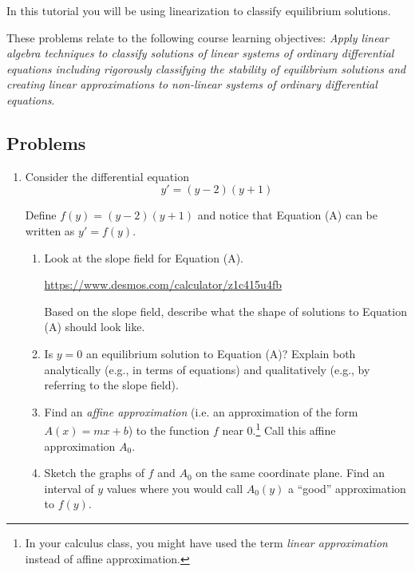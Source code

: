 \begin{objectives}
	In this tutorial you will be using linearization to classify equilibrium solutions.

	These problems relate to the following course learning objectives:
	\textit{Apply linear algebra techniques to classify solutions of linear systems of ordinary differential
	equations including rigorously classifying the stability of equilibrium solutions and creating
	linear approximations to non-linear systems of ordinary differential equations}.
\end{objectives}


\subsection*{Problems}

\begin{enumerate}
	\item 	Consider the differential equation
	      \begin{equation}
		      y'=(y-2)(y+1)\tag{A}
	      \end{equation}

	      Define $f(y)=(y-2)(y+1)$ and notice that Equation (A) can be written as $y'=f(y)$.

	      \begin{enumerate}
		      \item Look at the slope field for Equation (A).

		            \url{https://www.desmos.com/calculator/z1c415u4fb}

		            Based on the slope field, describe what the shape of solutions to Equation (A) should look like.

		      \item Is $y=0$ an equilibrium solution to Equation (A)? Explain both analytically (e.g., in terms of equations)
		            and qualitatively (e.g., by referring to the slope field).
		      \item Find an \emph{affine approximation} (i.e. an approximation of the form $A(x) = m x+b$)
		            to the function $f$ near $0$.\footnote{ In your calculus class, you might have used the term
			            \emph{linear approximation} instead of affine approximation.} Call this affine approximation $A_0$.

		      \item\label{sketch} Sketch the graphs of $f$ and $A_0$ on the same coordinate plane. Find an interval of $y$
			  	values where you  would
		            call $A_0(y)$ a ``good'' approximation to $f(y)$.


\end{enumerate}
\end{enumerate}
